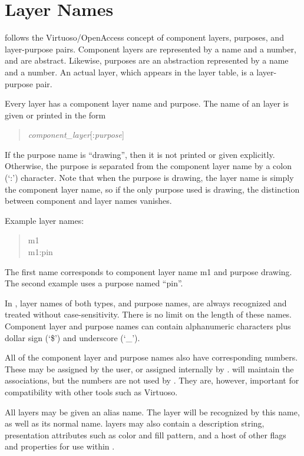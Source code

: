 \section{Layer Names}
\label{layername}

{\Xic} follows the Virtuoso/OpenAccess concept of component layers,
purposes, and layer-purpose pairs.  Component layers are represented
by a name and a number, and are abstract.  Likewise, purposes are an
abstraction represented by a name and a number.  An actual {\Xic}
layer, which appears in the layer table, is a layer-purpose pair.

Every {\Xic} layer has a component layer name and purpose.  The name
of an {\Xic} layer is given or printed in the form
\begin{quote}
{\it component\_layer\/}[{\vt :}{\it purpose\/}]
\end{quote}
If the purpose name is ``{\vt drawing}'', then it is not printed or
given explicitly.  Otherwise, the purpose is separated from the
component layer name by a colon (`{\vt :}') character.  Note that when
the purpose is {\vt drawing}, the {\Xic} layer name is simply the
component layer name, so if the only purpose used is {\vt drawing},
the distinction between component and {\Xic} layer names vanishes.

Example {\Xic} layer names:
\begin{quote}
{\vt m1}\\
{\vt m1:pin}
\end{quote}
The first name corresponds to component layer name {\vt m1}
and purpose {\vt drawing}.  The second example uses a purpose
named ``{\vt pin}''.

In {\Xic}, layer names of both types, and purpose names, are always
recognized and treated without case-sensitivity.  There is no limit on
the length of these names.  Component layer and purpose names can
contain alphanumeric characters plus dollar sign (`{\vt \$}') and
underscore (`{\vt \_}').

All of the component layer and purpose names also have corresponding
numbers.  These may be assigned by the user, or assigned internally by
{\Xic}.  {\Xic} will maintain the associations, but the numbers are
not used by {\Xic}.  They are, however, important for compatibility
with other tools such as Virtuoso.

All {\Xic} layers may be given an alias name.  The layer will be
recognized by this name, as well as its normal name.  {\Xic} layers
may also contain a description string, presentation attributes such as
color and fill pattern, and a host of other flags and properties for
use within {\Xic}.

